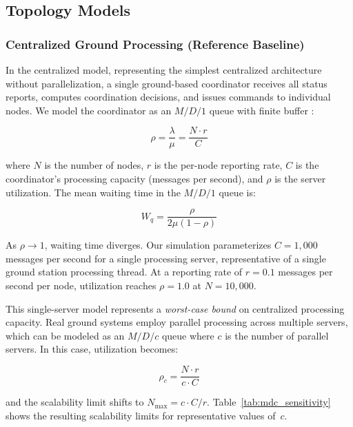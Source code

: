 \documentclass[journal]{IEEEtran}
\begin{document}
\subsection{Topology Models}

\subsubsection{Centralized Ground Processing (Reference Baseline)}

In the centralized model, representing the simplest centralized architecture without parallelization, a single ground-based coordinator receives all status reports, computes coordination decisions, and issues commands to individual nodes. We model the coordinator as an $M/D/1$ queue with finite buffer \cite{kleinrock_queueing}:

\begin{equation}
    \rho = \frac{\lambda}{\mu} = \frac{N \cdot r}{C}
    \label{eq:centralized_utilization}
\end{equation}

\noindent where $N$ is the number of nodes, $r$ is the per-node reporting rate, $C$ is the coordinator's processing capacity (messages per second), and $\rho$ is the server utilization. The mean waiting time in the $M/D/1$ queue is:

\begin{equation}
    W_q = \frac{\rho}{2\mu(1 - \rho)}
    \label{eq:md1_waiting}
\end{equation}

As $\rho \to 1$, waiting time diverges. Our simulation parameterizes $C = 1{,}000$ messages per second for a single processing server, representative of a single ground station processing thread. At a reporting rate of $r = 0.1$ messages per second per node, utilization reaches $\rho = 1.0$ at $N = 10{,}000$.

This single-server model represents a \emph{worst-case bound} on centralized processing capacity. Real ground systems employ parallel processing across multiple servers, which can be modeled as an $M/D/c$ queue where $c$ is the number of parallel servers. In this case, utilization becomes:

\begin{equation}
    \rho_c = \frac{N \cdot r}{c \cdot C}
    \label{eq:mdc_utilization}
\end{equation}

\noindent and the scalability limit shifts to $N_{\max} = c \cdot C / r$. Table~\ref{tab:mdc_sensitivity} shows the resulting scalability limits for representative values of~$c$.
\end{document}
